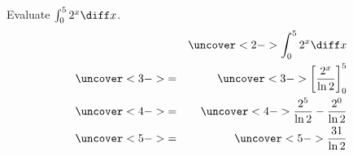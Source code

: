 \begin{frame}
\begin{example} %
Evaluate $\int_0^5 2^x \diff x$.
\begin{eqnarray*}
& & \uncover<2->{\int_0^5 2^x \diff x}\\%
& \uncover<3->{ = } & \uncover<3->{\left[ \frac{2^x}{\ln 2}\right]_0^5}\\%
& \uncover<4->{ = } & \uncover<4->{\frac{2^5}{\ln 2} - \frac{2^0}{\ln 2}}\\%
& \uncover<5->{ = } & \uncover<5->{\frac{31}{\ln 2}}%
\end{eqnarray*}
\end{example}
\end{frame}
